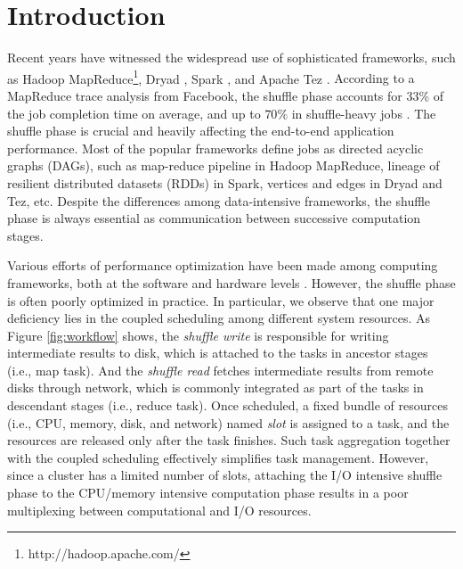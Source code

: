 \section{Introduction}\label{sec:introduction}
Recent years have witnessed the widespread use of sophisticated frameworks, such as Hadoop MapReduce\footnote{http://hadoop.apache.com/}, Dryad \cite{dryad}, Spark \cite{spark}, and Apache Tez \cite{tez}.
{\color{blue}
According to a MapReduce trace analysis from Facebook, the shuffle phase accounts for $33\%$ of the job completion time on average, and up to $70\%$ in shuffle-heavy jobs \cite{managing}.
The shuffle phase is crucial and heavily affecting the end-to-end application performance.
Most of the popular frameworks define jobs as directed acyclic graphs (DAGs), such as map-reduce pipeline in Hadoop MapReduce, lineage of resilient distributed datasets (RDDs) in Spark, vertices and edges in Dryad and Tez, etc.
Despite the differences among data-intensive frameworks, the shuffle phase is always essential as communication between successive computation stages.
}

{\color{blue}
Various efforts of performance optimization have been made among computing frameworks, both at the software and hardware levels \cite{sync, tachyon, heintz2016end, zhang2015prism, cheng2017improving, chen2017heterogeneous, yviquel2018cluster, kaitoua2014hadoop, wasi2017comprehensive, zhang2018simpo, chen2013tiled}. However, the shuffle phase is often poorly optimized in practice.
In particular, we observe that one major deficiency lies in the coupled scheduling among different system resources.
}
As Figure \ref{fig:workflow} shows, the \textit{shuffle write} is responsible for writing intermediate results to disk, which is attached to the tasks in ancestor stages (i.e., map task).  
And the \textit{shuffle read} fetches intermediate results from remote disks through network, which is commonly integrated as part of the tasks in descendant stages (i.e., reduce task). 
Once scheduled, a fixed bundle of resources (i.e., CPU, memory, disk, and network) named \textit{slot} is assigned to a task, and the resources are released only after the task finishes.
{\color{blue}
Such task aggregation together with the coupled scheduling effectively simplifies task management.
}
However, since a cluster has a limited number of slots, attaching the I/O intensive shuffle phase to the CPU/memory intensive computation phase results in a poor multiplexing between computational and I/O resources.


